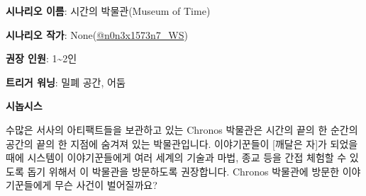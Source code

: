 \documentclass{report}
\begin{document}
	\textbf{시나리오 이름}: 시간의 박물관(Museum of Time)
	
	\textbf{시나리오 작가}: None(\href{https://www.twitter.com/n0n3x1573n7_WS}{@n0n3x1573n7\_WS})
	
	\textbf{권장 인원}: 1\textasciitilde2인
	
	\textbf{트리거 워닝}: 밀폐 공간, 어둠
	
	\textbf{시놉시스}
	
	수많은 서사의 아티팩트들을 보관하고 있는 Chronos 박물관은 시간의 끝의 한 순간의 공간의 끝의 한 지점에 숨겨져 있는 박물관입니다. 이야기꾼들이 [깨달은 자]가 되었을 때에 시스템이 이야기꾼들에게 여러 세계의 기술과 마법, 종교 등을 간접 체험할 수 있도록 돕기 위해서 이 박물관을 방문하도록 권장합니다. Chronos 박물관에 방문한 이야기꾼들에게 무슨 사건이 벌어질까요?
\end{document}
